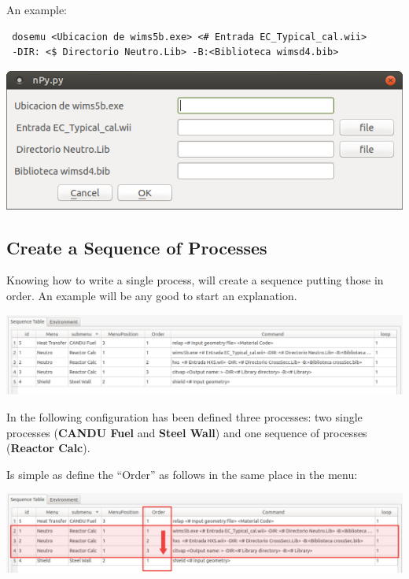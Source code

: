 \documentclass[a4paper,10pt]{article}
\begin{document}
\noindent An example:

\begin{verbatim}
 dosemu <Ubicacion de wims5b.exe> <# Entrada EC_Typical_cal.wii> 
 -DIR: <$ Directorio Neutro.Lib> -B:<Biblioteca wimsd4.bib>
 \end{verbatim}

\begin{center}
 \includegraphics[width=\textwidth]{img/contextMenuCombined.png}
\end{center}

\subsection{Create a Sequence of Processes}

Knowing how to write a single process, will create a sequence putting those in order. An example will be any good to start an explanation. 

\begin{center}
 \includegraphics[width=\textwidth]{img/orderingSequence.png}
\end{center}

In the following configuration has been defined three processes: two single processes (\textbf{CANDU Fuel} and \textbf{Steel Wall}) and one sequence of processes (\textbf{Reactor Calc}).

Is simple as define the ``Order'' as follows in the same place in the menu:

\begin{center}
 \includegraphics[width=\textwidth]{img/orderingSequenceMark.png}
\end{center}
\end{document}
